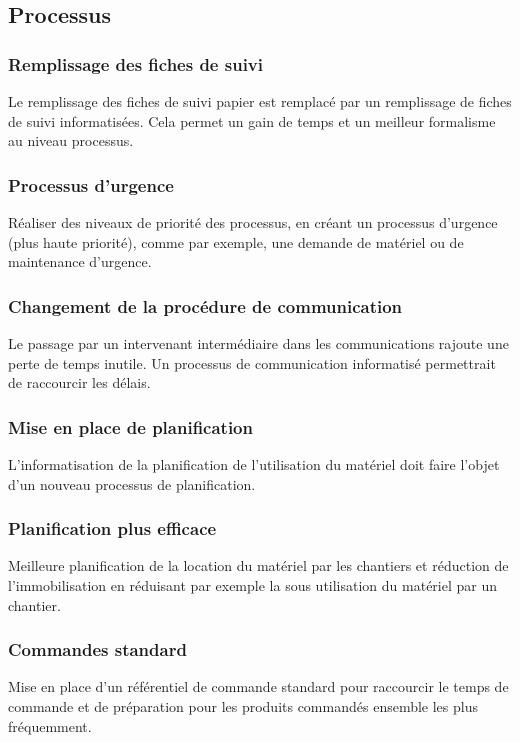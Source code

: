 \subsection{Processus}
 
\subsubsection{Remplissage des fiches de suivi}

Le remplissage des fiches de suivi papier est remplacé par un remplissage de 
fiches de suivi informatisées. 
Cela permet un gain de temps et un meilleur formalisme au niveau processus.

\subsubsection{Processus d’urgence}

Réaliser des niveaux de priorité des processus, en créant un processus d’urgence
 (plus haute priorité), comme par exemple, une demande de matériel 
ou de maintenance d’urgence.

\subsubsection{Changement de la procédure de communication}

Le passage par un intervenant intermédiaire dans les communications rajoute une 
perte de temps inutile. 
Un processus de communication informatisé permettrait de raccourcir les délais.

\subsubsection{Mise en place de planification}

L’informatisation de la planification de l’utilisation du matériel doit faire 
l’objet d’un nouveau processus de planification. 

\subsubsection{Planification plus efficace}

Meilleure planification de la location du matériel par les chantiers et 
réduction de l’immobilisation en réduisant par exemple la sous utilisation
du matériel par un chantier.

\subsubsection{Commandes standard}

Mise en place d'un référentiel de commande standard pour raccourcir le temps de
commande et de préparation pour les produits commandés ensemble les plus
fréquemment.
